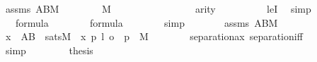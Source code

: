 \begin{isabellebody}
\ assms\ {\isacartoucheopen}A{\isasymtimes}B{\isasymin}M{\isacartoucheclose}\ \isamarkupfalse%
\isanewline
\ \ \ \ {\isachardoublequoteopen}\ {\isachardot}{\kern0pt}{\isachardot}{\kern0pt}{\isachardot}{\kern0pt}\ {\isasymin}\ M{\isachardoublequoteclose}\isanewline
\ \ \isamarkupfalse%
\ {\isacharminus}{\kern0pt}\isanewline
\ \ \ \ \isamarkupfalse%
\ {}\isanewline
\ \ \ \ \isamarkupfalse%
\ {\isachardoublequoteopen}arity{\isacharparenleft}{\kern0pt}{\isacharquery}{\kern0pt}{\isasympsi}{\isacharparenright}{\kern0pt}\ {\isasymle}\ {}{\isachardoublequoteclose}\isanewline
\ \ \ \ \ \ \isamarkupfalse%
\ leI\ \isamarkupfalse%
\ simp\isanewline
\ \ \ \ \isamarkupfalse%
\ \isamarkupfalse%
\ {\isacartoucheopen}{\isacharquery}{\kern0pt}{\isasymphi}{\isacharprime}{\kern0pt}\ {\isasymin}\ formula{\isacartoucheclose}\isanewline
\ \ \ \ \isamarkupfalse%
\ {\isachardoublequoteopen}{\isacharquery}{\kern0pt}{\isasympsi}\ {\isasymin}\ formula{\isachardoublequoteclose}\isanewline
\ \ \ \ \ \ \isamarkupfalse%
\ simp\isanewline
\ \ \ \ \isamarkupfalse%
\ \isamarkupfalse%
\ assms\ {\isacartoucheopen}A{\isasymtimes}B{\isasymin}M{\isacartoucheclose}\isanewline
\ \ \ \ \isamarkupfalse%
\ \isanewline
\ \ \ \ \isamarkupfalse%
\ {\isachardoublequoteopen}{\isacharbraceleft}{\kern0pt}x\ {\isasymin}\ A{\isasymtimes}B\ {\isachardot}{\kern0pt}\ sats{\isacharparenleft}{\kern0pt}M{\isacharcomma}{\kern0pt}\ {\isacharquery}{\kern0pt}{\isasympsi}{\isacharcomma}{\kern0pt}\ {\isacharbrackleft}{\kern0pt}x{\isacharcomma}{\kern0pt}\ p{\isacharcomma}{\kern0pt}\ l{\isacharcomma}{\kern0pt}\ o{\isacharcomma}{\kern0pt}\ {\isasymchi}{\isacharcomma}{\kern0pt}\ p{\isacharbrackright}{\kern0pt}{\isacharparenright}{\kern0pt}{\isacharbraceright}{\kern0pt}\ {\isasymin}\ M{\isachardoublequoteclose}\isanewline
\ \ \ \ \ \ \isamarkupfalse%
\ separation{\isacharunderscore}{\kern0pt}ax\ separation{\isacharunderscore}{\kern0pt}iff\isanewline
\ \ \ \ \ \ \isamarkupfalse%
\ simp\isanewline
\ \ \isamarkupfalse%
\isanewline
\ \ \isamarkupfalse%
\ \isamarkupfalse%
\ {\isacharquery}{\kern0pt}thesis\ \isacommand{{\isachardot}{\kern0pt}}\isamarkupfalse%
\isanewline
{}\isamarkupfalse%
%
\endisatagproof
{\isafoldproof}%
%
\isadelimproof
\isanewline
%
\endisadelimproof

\end{isabellebody}
